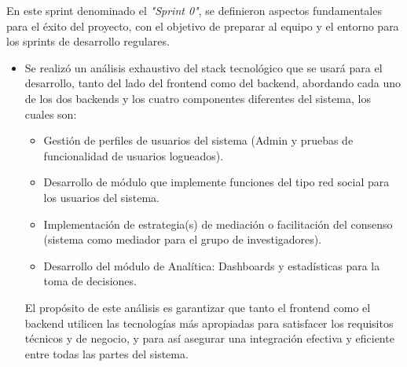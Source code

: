 En este sprint denominado el \textit{"Sprint 0"}, se definieron aspectos fundamentales para el éxito del proyecto, con el objetivo de preparar al equipo y el entorno para los sprints de desarrollo regulares. 

\begin{itemize}
    \item Se realizó un análisis exhaustivo del stack tecnológico que se usará para el desarrollo, tanto del lado del frontend como del backend, abordando cada uno de los dos backends y los cuatro componentes diferentes del sistema, los cuales son:
    \begin{itemize}
        \item Gestión de perfiles de usuarios del sistema (Admin y pruebas de funcionalidad de usuarios logueados).
        \item Desarrollo de módulo que implemente funciones del tipo red social para los usuarios del sistema.
        \item Implementación de estrategia(s) de mediación o facilitación del consenso (sistema como mediador para el grupo de investigadores).
        \item Desarrollo del módulo de Analítica: Dashboards y estadísticas para la toma de decisiones.
    \end{itemize}
    El propósito de este análisis es garantizar que tanto el frontend como el backend utilicen las tecnologías más apropiadas para satisfacer los requisitos técnicos y de negocio, y para así asegurar una integración efectiva y eficiente entre todas las partes del sistema.
    


\end{itemize}
